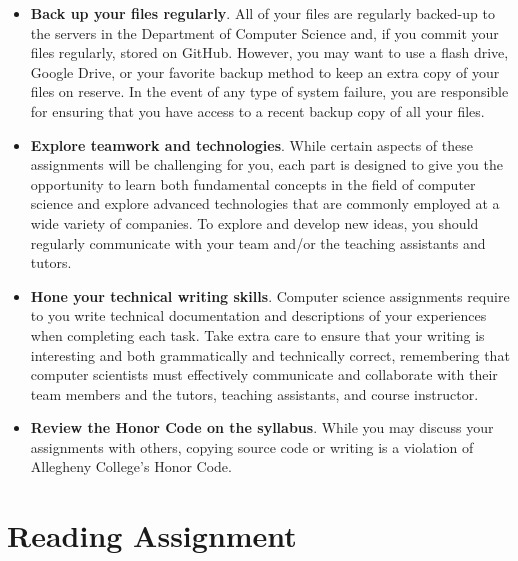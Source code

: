 \documentclass[11pt]{article}
\begin{document}
\begin{itemize}
\item {\bf Back up your files regularly}. All of your files are regularly
  backed-up to the servers in the Department of Computer Science and, if you
  commit your files regularly, stored on GitHub. However, you may want to use a
  flash drive, Google Drive, or your favorite backup method to keep an extra
  copy of your files on reserve. In the event of any type of system failure,
  you are responsible for ensuring that you have access to a recent backup copy
  of all your files.

\item {\bf Explore teamwork and technologies}. While certain aspects of these
  assignments will be challenging for you, each part is designed to give you the
  opportunity to learn both fundamental concepts in the field of computer
  science and explore advanced technologies that are commonly employed at a wide
  variety of companies. To explore and develop new ideas, you should regularly
  communicate with your team and/or the teaching assistants and tutors.

\item {\bf Hone your technical writing skills}. Computer science assignments
  require to you write technical documentation and descriptions of your
  experiences when completing each task. Take extra care to ensure that your
  writing is interesting and both grammatically and technically correct,
  remembering that computer scientists must effectively communicate and
  collaborate with their team members and the tutors, teaching assistants, and
  course instructor.

\item {\bf Review the Honor Code on the syllabus}. While you may discuss your
  assignments with others, copying source code or writing is a violation of
  Allegheny College's Honor Code.

\end{itemize}

\section*{Reading Assignment}


\end{document}
